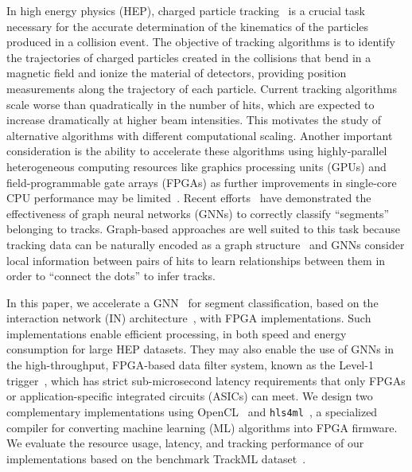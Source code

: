 \documentclass{article}
\newcommand{\hlsfml}{\texttt{hls4ml}\xspace}
\begin{document}
In high energy physics (HEP), charged particle tracking~\cite{Amrouche:2019wmx,Strandlie:2010zz} is a crucial task necessary for the accurate determination of the kinematics of the particles produced in a collision event.
The objective of tracking algorithms is to identify the trajectories of charged particles created in the collisions that bend in a magnetic field and ionize the material of detectors, providing position measurements along the trajectory of each particle.
Current tracking algorithms~\cite{Chatrchyan:2014fea,Aaboud:2017all,combkalman1,combkalman2,combkalman3,kalman} scale worse than quadratically in the number of hits, which are expected to increase dramatically at higher beam intensities. %
This motivates the study of alternative algorithms with different computational scaling. 
Another important consideration is the ability to accelerate these algorithms using highly-parallel heterogeneous computing resources like graphics processing units (GPUs) and field-programmable gate arrays (FPGAs) as further improvements in single-core CPU performance may be limited~\cite{breakdown,dennard}.
Recent efforts~\cite{Farrell:2018cjr,Ju:2020xty} have demonstrated the effectiveness of graph neural networks (GNNs) to correctly classify ``segments'' belonging to tracks.
Graph-based approaches are well suited to this task because tracking data can be naturally encoded as a graph structure~\cite{Shlomi:2020gdn} and GNNs consider local information between pairs of hits to learn relationships between them in order to ``connect the dots'' to infer tracks.

In this paper, we accelerate a GNN~\cite{Ju:2020xty} for segment classification, based on the interaction network (IN) architecture~\cite{Battaglia:2016jem,battaglia2018relational}, with FPGA implementations. 
Such implementations enable efficient processing, in both speed and energy consumption for large HEP datasets.
They may also enable the use of GNNs in the high-throughput, FPGA-based data filter system, known as the Level-1 trigger~\cite{ATLASL1T,ATLASP2L1T,CMSL1T,CMSP2L1T}, which has strict sub-microsecond latency requirements that only FPGAs or application-specific integrated circuits (ASICs) can meet.
We design two complementary implementations using OpenCL~\cite{OpenCL} and \hlsfml~\cite{Duarte:2018ite}, a specialized compiler for converting machine learning (ML) algorithms into FPGA firmware.
We evaluate the resource usage, latency, and tracking performance of our implementations based on the benchmark TrackML dataset~\cite{Amrouche:2019wmx}.
\end{document}
